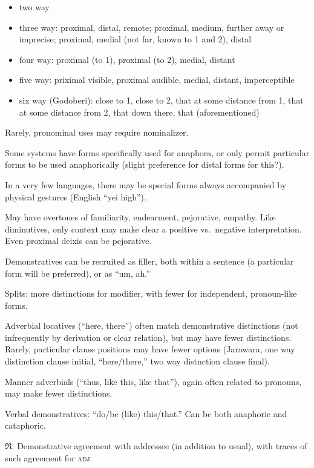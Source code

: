 \documentclass[11pt]{article}
\newcommand{\I}[1]{\textsc{#1}}   %
\newcommand{\rara}[1]{$\mathfrak{R}$: #1}
\newenvironment{grammarlist}%
 {\begin{itemize}\addtolength{\itemsep}{-0.5\baselineskip}\ignorespaces}%
 {\end{itemize}\ignorespacesafterend}
\begin{document}
\begin{grammarlist}
  \item two way
  \item three way: proximal, distal, remote; proximal, medium, further
    away or imprecise; proximal, medial (not far, known to 1 and 2),
    distal
  \item four way: proximal (to 1), proximal (to 2), medial, distant
  \item five way: priximal visible, proximal audible, medial, distant,
    imperceptible
  \item six way (Godoberi): close to 1, close to 2, that at some
    distance from 1, that at some distance from 2, that down there,
    that (aforementioned)
\end{grammarlist}

Rarely, pronominal uses may require nominalizer.

Some systems have forms specifically used for anaphora, or only permit
particular forms to be used anaphorically (slight preference for
distal forms for this?).

In a very few languages, there may be special forms always accompanied
by physical gestures (English ``yei high'').

May have overtones of familiarity, endearment, pejorative,
empathy.  Like diminutives, only context may make clear a positive
vs.\ negative interpretation.  Even proximal deixis can be
pejorative. 

Demonstratives can be recruited as filler, both within a sentence (a
particular form will be preferred), or as ``um, ah.''

Splits: more distinctions for modifier, with fewer for independent,
pronoun-like forms. 

Adverbial locatives (``here, there'') often match demonstrative
distinctions (not infrequently by derivation or clear relation), but
may have fewer distinctions.  Rarely, particular clause positions may
have fewer options (Jarawara, one way distinction clause initial,
``here/there,'' two way distnction clause final).

Manner adverbials (``thus, like this, like that''), again often
related to pronouns, may make fewer distinctions.

Verbal demonstratives: ``do/be (like) this/that.'' Can be both
anaphoric and cataphoric.

\rara{Demonstrative agreement with addressee (in addition to usual),
  with traces of such agreement for \I{adj}.}
\end{document}
